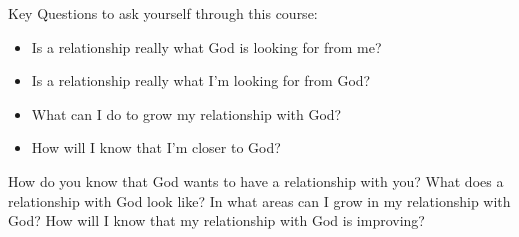 \begin{discussion}
Key Questions to ask yourself through this course:

\begin{itemize}
\item Is a relationship really what God is looking for from me?
\item Is a relationship really what I'm looking for from God?
\item What can I do to grow my relationship with God?
\item How will I know that I'm closer to God?
\end{itemize}


\end{discussion}

\begin{questions}
\q How do you know that God wants to have a relationship with you?
\q What does a relationship with God look like?
\q In what areas can I grow in my relationship with God?
\q How will I know that my relationship with God is improving?
\end{questions}
